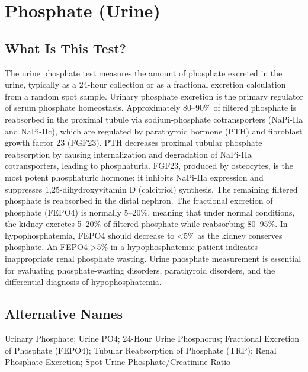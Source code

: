 \chapter{Phosphate (Urine)}

\section*{What Is This Test?}
The urine phosphate test measures the amount of phosphate excreted in the urine, typically as a 24-hour collection or as a fractional excretion calculation from a random spot sample. Urinary phosphate excretion is the primary regulator of serum phosphate homeostasis. Approximately 80--90\% of filtered phosphate is reabsorbed in the proximal tubule via sodium-phosphate cotransporters (NaPi-IIa and NaPi-IIc), which are regulated by parathyroid hormone (PTH) and fibroblast growth factor 23 (FGF23). PTH decreases proximal tubular phosphate reabsorption by causing internalization and degradation of NaPi-IIa cotransporters, leading to phosphaturia. FGF23, produced by osteocytes, is the most potent phosphaturic hormone: it inhibits NaPi-IIa expression and suppresses 1,25-dihydroxyvitamin D (calcitriol) synthesis. The remaining filtered phosphate is reabsorbed in the distal nephron. The fractional excretion of phosphate (FEPO4) is normally 5--20\%, meaning that under normal conditions, the kidney excretes 5--20\% of filtered phosphate while reabsorbing 80--95\%. In hypophosphatemia, FEPO4 should decrease to <5\% as the kidney conserves phosphate. An FEPO4 >5\% in a hypophosphatemic patient indicates inappropriate renal phosphate wasting. Urine phosphate measurement is essential for evaluating phosphate-wasting disorders, parathyroid disorders, and the differential diagnosis of hypophosphatemia.

\section*{Alternative Names}
Urinary Phosphate; Urine PO4; 24-Hour Urine Phosphorus; Fractional Excretion of Phosphate (FEPO4); Tubular Reabsorption of Phosphate (TRP); Renal Phosphate Excretion; Spot Urine Phosphate/Creatinine Ratio

